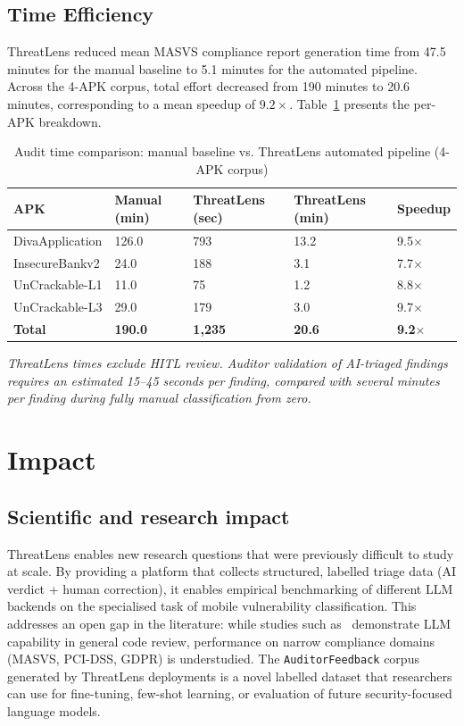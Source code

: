 \documentclass[preprint,12pt,a4paper]{elsarticle}
\begin{document}
\subsection{Time Efficiency}

ThreatLens reduced mean MASVS compliance report generation time from 47.5 minutes
for the manual baseline to 5.1 minutes for the automated pipeline. Across the 4-APK
corpus, total effort decreased from 190 minutes to 20.6 minutes, corresponding to a
mean speedup of $9.2\times$. Table~\ref{tab:time_comparison} presents the per-APK
breakdown.

\begin{table}[!h]
\caption{Audit time comparison: manual baseline vs. ThreatLens automated pipeline (4-APK corpus)}
\label{tab:time_comparison}
\centering
\begin{tabular}{lllll}
\hline
APK & Manual (min) & ThreatLens (sec) & ThreatLens (min) & Speedup \\
\hline
DivaApplication & 126.0 & 793 & 13.2 & 9.5$\times$ \\
InsecureBankv2 & 24.0 & 188 & 3.1 & 7.7$\times$ \\
UnCrackable-L1 & 11.0 & 75 & 1.2 & 8.8$\times$ \\
UnCrackable-L3 & 29.0 & 179 & 3.0 & 9.7$\times$ \\
\hline
\textbf{Total} & \textbf{190.0} & \textbf{1,235} & \textbf{20.6} & \textbf{9.2$\times$} \\
\hline
\end{tabular}
\end{table}

\textit{ThreatLens times exclude HITL review. Auditor validation of AI-triaged findings
requires an estimated 15--45 seconds per finding, compared with several minutes per
finding during fully manual classification from zero.}

\section{Impact}

\subsection{Scientific and research impact}

ThreatLens enables new research questions that were previously difficult to study at scale.
By providing a platform that collects structured, labelled triage data (AI verdict +
human correction), it enables empirical benchmarking of different LLM backends on the
specialised task of mobile vulnerability classification. This addresses an open gap in the
literature: while studies such as~\cite{llm_vuln} demonstrate LLM capability in general
code review, performance on narrow compliance domains (MASVS, PCI-DSS, GDPR) is
understudied. The \texttt{AuditorFeedback} corpus generated by ThreatLens deployments
is a novel labelled dataset that researchers can use for fine-tuning, few-shot learning,
or evaluation of future security-focused language models.
\end{document}

